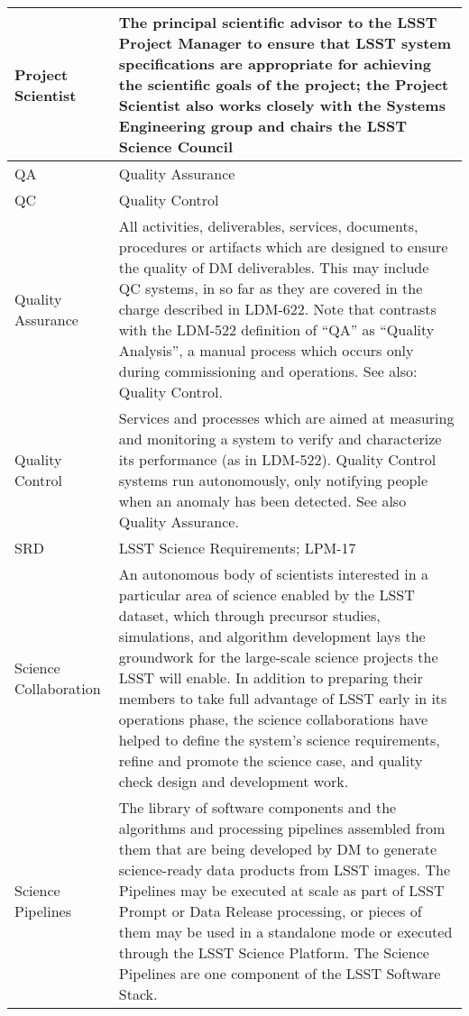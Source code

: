 \begin{longtable}{|l|p{}|}
Project Scientist & The principal scientific advisor  to the \gls{LSST} \gls{Project Manager} to ensure that \gls{LSST} system specifications are appropriate for achieving the scientific goals of the project; the \gls{Project Scientist} also works closely with the \gls{Systems Engineering} group and chairs the \gls{LSST} Science Council \\\hline
QA & \gls{Quality Assurance} \\\hline
QC & \gls{Quality Control} \\\hline
Quality Assurance & All activities, deliverables, services, documents, procedures or artifacts which are designed to ensure the quality of DM deliverables. This may include \gls{QC} systems, in so far as they are covered in the charge described in \gls{LDM}-622. Note that contrasts with the \gls{LDM}-522 definition of “QA” as “Quality Analysis”, a manual process which occurs only during commissioning and operations. See also: \gls{Quality Control}. \\\hline
Quality Control & Services and processes which are aimed at measuring and \gls{monitoring} a system to verify and characterize its performance (as in \gls{LDM}-522). \gls{Quality Control} systems run autonomously, only notifying people when an anomaly has been detected. See also \gls{Quality Assurance}. \\\hline
SRD & \gls{LSST} Science Requirements; \gls{LPM}-17 \\\hline
Science Collaboration & An autonomous body of scientists interested in a particular area of science enabled by the \gls{LSST} dataset, which through precursor studies, simulations, and \gls{algorithm} development lays the groundwork for the large-scale science projects the \gls{LSST} will enable.  In addition to preparing their members to take full advantage of \gls{LSST} early in its operations phase, the science collaborations have helped to define the system's science requirements, refine and promote the science case, and quality check design and development work. \\\hline
Science Pipelines & The library of software components and the algorithms and processing pipelines assembled from them that are being developed by \gls{DM} to generate science-ready data products from \gls{LSST} images. The Pipelines may be executed at scale as part of \gls{LSST} Prompt or \gls{Data Release} processing, or pieces of them may be used in a standalone mode or executed through the \gls{LSST} \gls{Science Platform}. The \gls{Science Pipelines} are one component of the \gls{LSST} \gls{Software Stack}. \\\hline

\end{longtable}
